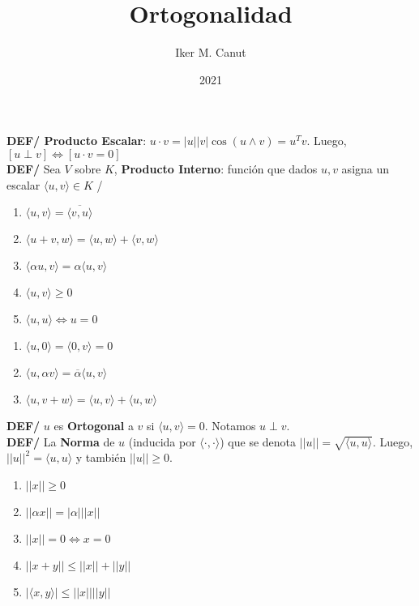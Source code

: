 \documentclass[10pt,a4paper]{article}
\author{Iker M. Canut}
\title{Ortogonalidad}
\date{2021}
\begin{document}
\textbf{DEF/ Producto Escalar}: $u \cdot v = |u||v|\cos(u \wedge v) = u^Tv$. Luego, $[u \perp v] \iff [u \cdot v = 0]$\\
\textbf{DEF/} Sea $V$ sobre $K$, \textbf{Producto Interno}: funci\'on que dados $u,v$ asigna un escalar $\langle u,v \rangle \in K$ /
\vspace{-1pc}
\begin{multicols}{3}
\begin{enumerate}
\item $\langle u,v \rangle = \overline{\langle v,u \rangle}$
\item $\langle u+v,w \rangle = \langle u,w \rangle + \langle v,w \rangle$
\item $\langle \alpha u,v \rangle = \alpha \langle u,v \rangle$
\item $\langle u,v \rangle \geq 0$
\item $\langle u,u \rangle \iff u = 0$
\end{enumerate}
\end{multicols}
\vspace{-1pc}
\vspace{-1pc}
\begin{multicols}{3}
\begin{enumerate}
\item $\langle u,0 \rangle = \langle 0,v \rangle = 0$
\item $\langle u,\alpha v \rangle = \overline{\alpha} \langle u,v \rangle$
\item $\langle u,v+w \rangle = \langle u,v \rangle + \langle u,w \rangle$
\end{enumerate}
\end{multicols}
\vspace{-1pc}
\textbf{DEF/} $u$ es \textbf{Ortogonal} a $v$ si $\langle u,v \rangle = 0$. Notamos $u \perp v$.\\
\textbf{DEF/} La \textbf{Norma} de $u$ (inducida por $\langle \cdot , \cdot \rangle$) que se denota $||u|| = \sqrt{\langle u, u \rangle}$. Luego, $||u||^2 = \langle u, u \rangle$ y tambi\'en $||u|| \geq 0$.\\
\vspace{-2pc}
\begin{multicols}{3}
\begin{enumerate}
\item $||x|| \geq 0$
\item $||\alpha x|| = |\alpha|||x||$
\item $||x|| = 0 \iff x = 0$
\item $||x+y|| \leq ||x||+||y||$
\item $|\langle x,y\rangle| \leq ||x||||y||$
\end{enumerate}
\end{multicols}
\end{document}
